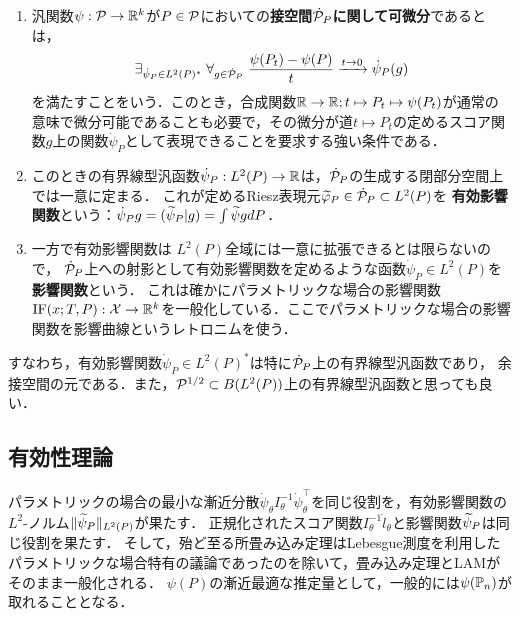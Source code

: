 \documentclass[uplatex,dvipdfmx]{jsreport}
\begin{document}
\begin{definition}\mbox{}
    \begin{enumerate}
        \item 汎関数$\psi:\P\to\R^k$が$P\in\P$においての\textbf{接空間$\dot{\P}_P$に関して可微分}であるとは，
        \[\exists_{\dot{\psi}_P\in L^2(P)^*}\;\forall_{g\in\dot{\P}_P}\;\frac{\psi(P_t)-\psi(P)}{t}\xrightarrow{t\to0}\dot{\psi}_P(g)\]
        を満たすことをいう．このとき，合成関数$\R\to\R;t\mapsto P_t\mapsto \psi(P_t)$が通常の意味で微分可能であることも必要で，その微分が道$t\mapsto P_t$の定めるスコア関数$g$上の関数$\dot{\psi}_P$として表現できることを要求する強い条件である．
        \item このときの有界線型汎函数$\dot{\psi}_P:L^2(P)\to\R$は，$\dot{\P}_P$の生成する閉部分空間上では一意に定まる．
        これが定めるRiesz表現元$\wt{\varphi}_P\in\dot{\P}_P\subset L^2(P)$を
        \textbf{有効影響関数}という：$\dot{\psi}_Pg=(\wt{\psi}_P|g)=\int\wt{\psi}gdP$．
        \item 
        一方で有効影響関数は
        $L^2(P)$全域には一意に拡張できるとは限らないので，
        $\dot{\P}_P$上への射影として有効影響関数を定めるような函数$\dot{\psi}_P\in L^2(P)$を\textbf{影響関数}という．
        これは確かにパラメトリックな場合の影響関数$\IF(x;T,P):\X\to\R^k$を一般化している．ここでパラメトリックな場合の影響関数を影響曲線というレトロニムを使う．
    \end{enumerate}
\end{definition}
\begin{remarks}
    すなわち，有効影響関数$\dot{\psi}_P\in L^2(P)^*$は特に$\dot{\P}_P$上の有界線型汎函数であり，
    余接空間の元である．また，$\P^{1/2}\subset B(L^2(P))$上の有界線型汎函数と思っても良い．
\end{remarks}

\subsection{有効性理論}

\begin{tcolorbox}[colframe=ForestGreen, colback=ForestGreen!10!white,breakable,colbacktitle=ForestGreen!40!white,coltitle=black,fonttitle=\bfseries\sffamily,
title=]
    パラメトリックの場合の最小な漸近分散$\dot{\psi}_\theta I^{-1}_\theta\dot{\psi}_\theta^\top$を同じ役割を，有効影響関数の$L^2$-ノルム$\norm{\wt{\psi}_P}_{L^2(P)}$が果たす．
    正規化されたスコア関数$I^{-1}_\theta\dot{l}_\theta$と影響関数$\wt{\psi}_P$は同じ役割を果たす．
    そして，殆ど至る所畳み込み定理はLebesgue測度を利用したパラメトリックな場合特有の議論であったのを除いて，畳み込み定理とLAMがそのまま一般化される．
    $\psi(P)$の漸近最適な推定量として，一般的には$\psi(\bP_n)$が取れることとなる．
\end{tcolorbox}
\end{document}

